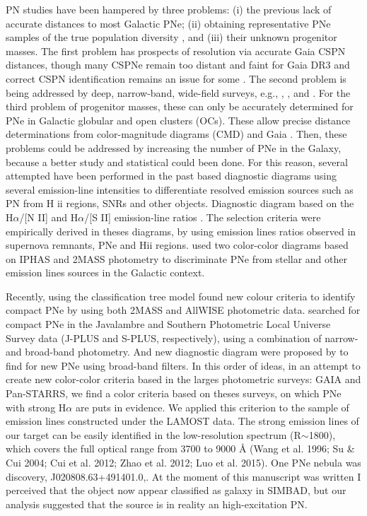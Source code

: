 \documentclass[fleqn,usenatbib]{mnras}
\begin{document}
PN studies have been hampered by three problems:
(i) the previous lack of accurate distances to most Galactic
PNe; (ii) obtaining representative PNe samples of the true
population diversity \citep{Parker:2022}, and (iii) their unknown
progenitor masses. The first problem has prospects of
resolution via accurate Gaia CSPN distances, though many
CSPNe remain too distant and faint for Gaia DR3 and correct
CSPN identification remains an issue for some \citep{Parker:2022}.
The second problem is being addressed by deep, narrow-band,
wide-field surveys, e.g., \citet{Parker:2005},
\citet{Drew:2005}, and \citet{Drew:2014}. For the third problem
of progenitor masses, these can only
be accurately determined for PNe in Galactic globular and
open clusters (OCs). These allow precise distance determinations
from color-magnitude diagrams (CMD) and Gaia \citep{Fragkou:2022}.
Then, these problems could be addressed by increasing the
number of PNe in the Galaxy, because a better study and statistical
could been done. For this reason, several attempted have been performed in the past
based diagnostic diagrams using several
emission-line intensities to differentiate resolved emission
sources such as PN from H {\sc ii} regions, SNRs and other objects.
Diagnostic diagram based on the H{$\alpha$}/[N II] and H{$\alpha$}/[S II]
emission-line ratios \citep{Sabbadin:1977, Fesen:1985, Riesgo:2006}.
The selection criteria were empirically derived in theses diagrams,
by using emission lines ratios observed in supernova remnants, PNe and H{\sc ii} regions.
\citet{Viironen:2009a, Viironen:2009b} used two color-color diagrams based on IPHAS
and 2MASS photometry to discriminate PNe from stellar and other emission lines sources
in the Galactic context. 

Recently, \citet{Akras:2019b} using the classification tree model
found new colour criteria to identify compact PNe  by
using both 2MASS and AllWISE photometric data. \citet{Gutierrez-Soto:2020}
searched for compact PNe in the Javalambre and Southern Photometric Local
Universe Survey data (J-PLUS and S-PLUS, respectively), using a combination
of narrow- and broad-band photometry. And new diagnostic diagram were proposed
by \citet{Vejar:2019} to find for new PNe using broad-band filters.
In this order of ideas, in an attempt to create new color-color criteria based
in the larges photometric surveys: GAIA and Pan-STARRS, we find a color criteria
based on theses surveys, on which PNe with strong H{$\alpha$} are puts in
evidence. We applied this criterion to the sample of emission lines constructed
under the LAMOST data. The strong emission lines of our target can be easily identiﬁed in
the low-resolution spectrum (R$\sim$1800), which covers the full
optical range from 3700 to 9000 Å (Wang et al. 1996; Su \&
Cui 2004; Cui et al. 2012; Zhao et al. 2012; Luo et al. 2015).
One PNe nebula was discovery, J020808.63+491401.0,.
At the moment of this manuscript was written I perceived that the
object now appear classified as galaxy in SIMBAD, but our analysis
suggested that the source is in reality an high-excitation PN. 
\end{document}

